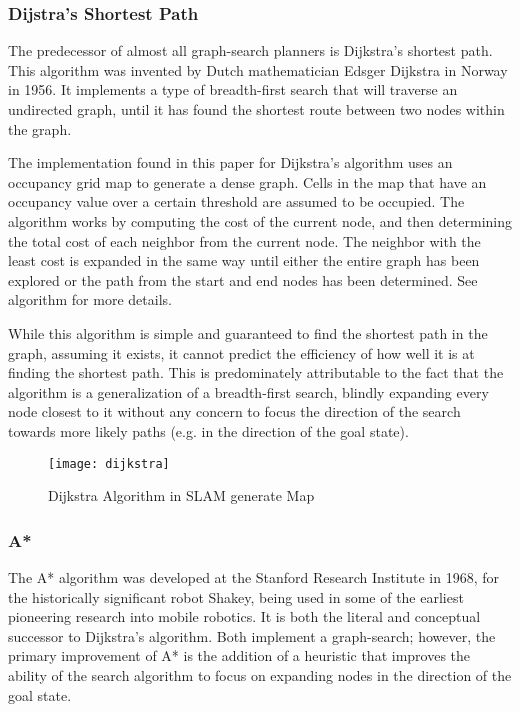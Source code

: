 \subsubsection{Dijstra's Shortest Path}
The predecessor of almost all graph-search planners is Dijkstra's shortest path. This algorithm was invented by Dutch mathematician Edsger Dijkstra in Norway in 1956. It implements a type of breadth-first search that will traverse an undirected graph, until it has found the shortest route between two nodes within the graph. 

The implementation found in this paper for Dijkstra's algorithm uses an occupancy grid map to generate a dense graph. Cells in the map that have an occupancy value over a certain threshold are assumed to be occupied. The algorithm works by computing the cost of the current node, and then determining the total cost of each neighbor from the current node. The neighbor with the least cost is expanded in the same way until either the entire graph has been explored or the path from the start and end nodes has been determined. See algorithm for more details.

While this algorithm is simple and guaranteed to find the shortest path in the graph, assuming it exists, it cannot predict the efficiency of how well it is at finding the shortest path. This is predominately attributable to the fact that the algorithm is a generalization of a breadth-first search, blindly expanding every node closest to it without any concern to focus the direction of the search towards more likely paths (e.g. in the direction of the goal state).






\begin{figure}[h!]
    \texttt{[image: dijkstra]}
    \centering
    \label{fig:Dijkstra}
    \caption{Dijkstra Algorithm in SLAM generate Map}
\end{figure}


\subsubsection{A*}

The A* algorithm was developed at the Stanford Research Institute in 1968, for the historically significant robot Shakey, being used in some of the earliest pioneering research into mobile robotics. It is both the literal and conceptual successor to Dijkstra's algorithm. Both implement a graph-search; however, the primary improvement of A* is the addition of a heuristic that improves the ability of the search algorithm to focus on expanding nodes in the direction of the goal state.  

